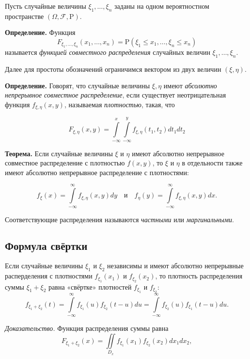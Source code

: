 \documentclass[11pt,a4paper]{article}
\begin{document}
Пусть случайные величины \(\xi_1, \ldots, \xi_n\) заданы на одном
вероятностном пространстве \((\Omega, \mathcal{F}, \mathrm{P})\).

\textbf{Определение.} Функция \[
  F_{\xi_1, \ldots, \xi_n}(x_1, \ldots, x_n) = \mathrm{P}(\xi_1 \le x_1, \ldots, \xi_n \le x_n)
\] называется \emph{функцией совместного распределения} случайных
величин \(\xi_1, \ldots , \xi_n\).

Далее для простоты обозначений ограничимся вектором из двух величин
\((\xi, \eta)\).

\textbf{Определение.} Говорят, что случайные величины \(\xi, \eta\)
имеют \emph{абсолютно непрерывное совместное распределение}, если
существует неотрицательная функция \(f_{\xi, \eta}(x, y)\), называемая
\emph{плотностью}, такая, что

\[
  F_{\xi, \eta}(x, y) = \int\limits_{-\infty}^{x} \int\limits_{-\infty}^{y} f_{\xi, \eta}(t_1, t_2) dt_1 dt_2
\]

\textbf{Теорема.} Если случайные величины \(\xi\) и \(\eta\) имеют
абсолютно непрерывное совместное распределение с плотностью \(f(x, y)\),
то \(\xi\) и \(\eta\) в отдельности также имеют абсолютно непрерывное
распределение с плотностями:

\[
  f_{\xi}(x) = \int\limits_{-\infty}^{\infty} f_{\xi, \eta}(x, y)dy \quad \mathrm{и} \quad f_{\eta}(y) = \int\limits_{-\infty}^{\infty} f_{\xi, \eta}(x, y)dx.
\]

Соответствующие распределения называются \emph{частными} или
\emph{маргинальными}.

    \hypertarget{ux444ux43eux440ux43cux443ux43bux430-ux441ux432ux451ux440ux442ux43aux438}{%
\subsection{Формула
свёртки}\label{ux444ux43eux440ux43cux443ux43bux430-ux441ux432ux451ux440ux442ux43aux438}}

Если случайные величины \(\xi_1\) и \(\xi_2\) независимы и имеют
абсолютно непрерывные расперделения с плотностями \(f_{\xi_1}(x_1)\) и
\(f_{\xi_2}(x_2)\), то плотность распределения суммы \(\xi_1 + \xi_2\)
равна «свёртке» плотностей \(f_{\xi_1}\) и \(f_{\xi_2}\): \[
  f_{\xi_1 +\xi_2}(t) = \int\limits_{-\infty}^{\infty} f_{\xi_1}(u) f_{\xi_2}(t-u) du
  = \int\limits_{-\infty}^{\infty} f_{\xi_2}(u) f_{\xi_1}(t-u) du.
\]

    \emph{Доказательство.} Функция распределения суммы равна \[
  F_{\xi_1 +\xi_2}(x) = \iint\limits_{D_x} f_{\xi_1}(x_1) f_{\xi_2}(x_2) dx_1 dx_2,
\]
\end{document}
